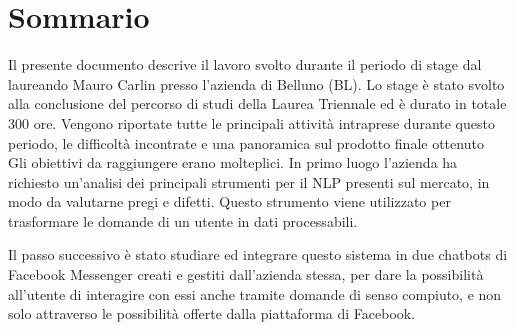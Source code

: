 
\cleardoublepage
{}
{}
\begingroup
\let\clearpage\relax
\let\cleardoublepage\relax
\let\cleardoublepage\relax

\chapter*{Sommario}

Il presente documento descrive il lavoro svolto durante il periodo di stage dal laureando Mauro Carlin presso l'azienda \azienda{} di Belluno (BL). Lo stage è stato svolto alla conclusione del percorso di studi della Laurea Triennale ed è durato in totale 300 ore. Vengono riportate tutte le principali attività intraprese durante questo periodo, le difficoltà incontrate e una panoramica sul prodotto finale ottenuto\\
Gli obiettivi da raggiungere erano molteplici. In primo luogo l'azienda ha richiesto un'analisi dei principali strumenti per il \gls{NLP} presenti sul mercato, in modo da valutarne pregi e difetti. Questo strumento viene utilizzato per trasformare le domande di un utente in dati processabili.


Il passo successivo è stato studiare ed integrare questo sistema in due \glspl{chatbot} di Facebook Messenger creati e gestiti dall'azienda stessa, per dare la possibilità all'utente di interagire con essi anche tramite domande di senso compiuto, e non solo attraverso le possibilità offerte dalla piattaforma di Facebook.\\

%
%

\endgroup			

\vfill